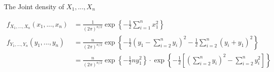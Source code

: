 \documentclass{article}
\begin{document}
\begin{enumerate}
    The Joint density of $X_1,...,X_n$

    \begin{equation*}
        \begin{split}
            f_{X_1,...,X_n}(x_1,...,x_n) &= \frac{1}{(2\pi)^{n/2}} \exp \left\{-\frac{1}{2}\sum_{i=1}^n x_1^2 \right\}\\
            f_{Y_1,...,Y_n}(y_1,...,y_n) &= \frac{n}{(2\pi)^{n/2}}\exp \left\{-\frac{1}{2} \left(y_1 - \sum_{i=2}^n y_i \right)^2 - \frac{1}{2} \sum_{i=2}^n (y_i + y_1)^2  \right\}\\
            &= \frac{n}{(2\pi)^{n/2}}\exp \left\{-\frac{1}{2} n y_1^2 \right\} \cdot \exp \left\{-\frac{1}{2}\left[\left(\sum_{i=2}^n y_i \right)^2 - \sum_{i=2}^n y_i^2 \right] \right\}
        \end{split}
    \end{equation*}
\end{enumerate}
\end{document}
